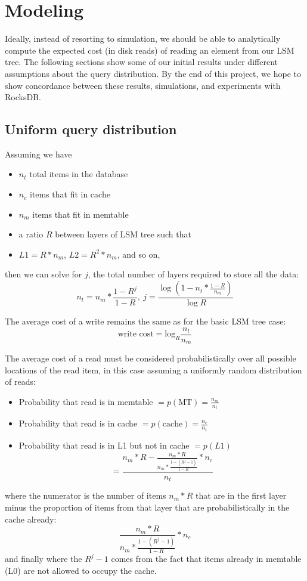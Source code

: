 \documentclass{sig-alternate-05-2015}
\begin{document}
\section{Modeling}

Ideally, instead of resorting to simulation, we should be able to analytically compute the expected cost (in disk reads) of reading an element from our LSM tree. The following sections show some of our initial results under different assumptions about the query distribution. By the end of this project, we hope to show concordance between these results, simulations, and experiments with RocksDB.

\subsection{Uniform query distribution}

\noindent Assuming we have
\begin{itemize}
  \item $n_t$ total items in the database
  \item $n_c$ items that fit in cache
  \item $n_m$ items that fit in memtable
  \item a ratio $R$ between layers of LSM tree such that
  \item $L1 = R * n_m$, $L2 = R^2 * n_m$, and so on,
\end{itemize}

\noindent then we can solve for $j$, the total number of layers required to store all the data: \\
$$n_t = n_m * \frac{1-R^j}{1-R},\  j = \frac{\log(1-n_t*\frac{1-R}{n_m})}{\log R}$$

The average cost of a write remains the same as for the basic LSM tree case:
$$
\text{write cost} = \textrm{log}_{R} \frac{n_t}{n_m}
$$

The average cost of a read must be considered probabilistically over all possible locations of the read item, in this case assuming a uniformly random distribution of reads:
\begin{itemize}
\item Probability that read is in memtable $= p(\text{MT}) = \frac{n_m}{n_t}$
\item Probability that read is in cache $= p(\text{cache}) = \frac{n_c}{n_t}$
\item Probability that read is in L1 but not in cache $= p(L1)$ $$= \frac{n_m * R - \frac{n_m * R}{n_m * \frac{1-(R^j-1)}{1-R}} * n_c}{n_t}$$
\end{itemize}
where the numerator is the number of items $n_m * R$ that are in the first layer minus the proportion of items from that layer that are probabilistically in the cache already: $$\frac{n_m * R}{n_m * \frac{1-(R^j-1)}{1-R}} * n_c$$
and finally where the $R^j -1$ comes from the fact that items already in memtable (L0) are not allowed to occupy the cache.
\end{document}
